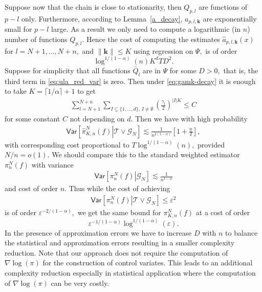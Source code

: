 \documentclass[preprint]{imsart}
\def\NtrainPath{T}
\def\TrainSet{\mathcal{T}}
\begin{document}
Suppose now that the chain is close to stationarity, then \(Q_{p,l}\) are functions of \(p-l\) only.
Furthermore,  according to Lemma~\ref{a_decay}, \(a_{p,l,\mathbf{k}}\) are exponentially small for \(p-l\) large.
As a result we only need to compute a logarithmic (in \(n\)) number of functions \(Q_{p,l}.\)
Hence the cost of computing the estimates  \(\widehat {a}_{p,l,\mathbf{k}}(x)\) for \(l=N+1,\ldots,N+n,\) and \(\|\mathbf{k}\|\leq K\) using regression on \(\Psi,\) is of order
\[
\log^{1/(1-\alpha)} (n) K^d  \NtrainPath D^2.
\]
Suppose for simplicity that all functions \(\bar{Q}_l\) are in \(\Psi\) for some \(D>0,\) that is, the third term in \eqref{eq:ula_red_var} is zero.  Then under \eqref{eq:gamk-decay} it is enough to take \(K=\lceil 1/\alpha \rceil+1\) to get
\begin{eqnarray*}
\sum_{l=N+1}^{N+n}\sum_{I\subseteq\{1,\ldots,d\},\, I\neq \emptyset}
\left(\frac{\gamma_{l}}{2}\right)^{|I|K}\leq C
\end{eqnarray*}
for some constant \(C\) not depending on \(d.\) Then we have with high probability
\begin{eqnarray*}
\mathsf{Var}\left[\left.\widehat \pi_{K,n}^N(f)\right | \TrainSet \vee \mathcal{G}_N\right]\lesssim \frac{1}{n^{2(1-\alpha)}}\left[1+\frac{n}{\NtrainPath}\right],
\end{eqnarray*}
with corresponding cost proportional to \(\NtrainPath\log^{1/(1-\alpha)} (n) ,\) provided \(N/n=o(1).\) We should compare this to the standard weighted estimator \(\pi_{n}^N(f)\) with variance
\begin{eqnarray*}
\mathsf{Var}\left[\left. \pi_{n}^N(f)\right |  \mathcal{G}_N\right]\lesssim \frac{1}{n^{1-\alpha}}
\end{eqnarray*}
and cost of order \(n.\) Thus while the cost of achieving
\begin{eqnarray*}
\mathsf{Var}\left[\left. \pi_{n}^N(f)\right | \TrainSet \vee \mathcal{G}_N\right]\leq \varepsilon^2
\end{eqnarray*}
is of order  \(\varepsilon^{-2/(1-\alpha)},\) we get the same bound for \(\pi_{K,n}^N(f)\) at a cost of order
\[
\varepsilon^{-1/(1-\alpha)}\log^{1/(1-\alpha)} (\varepsilon).
\]
In the presence of approximation errors we have to increase \(D\) with \(n\) to balance  the statistical and approximation errors resulting in a smaller complexity reduction. Note that our approach does not require the computation of \(\nabla \log(\pi)\) for the construction of control variates. This leads to an additional complexity reduction especially in statistical application where the computation of \(\nabla \log(\pi)\) can be very costly.
\end{document}
